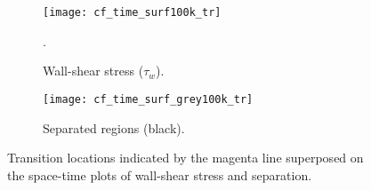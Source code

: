 \begin{figure}[h]
	\centering
	\begin{subfigure}[t]{0.46\textwidth}
		\centering
		\texttt{[image: cf\_time\_surf100k\_tr]}
		\caption{Wall-shear stress ($\tau_{w}$).}. 
		\label{fig:cf-time_tr}
	\end{subfigure}
	\begin{subfigure}[t]{0.45\textwidth}
		\centering
		\texttt{[image: cf\_time\_surf\_grey100k\_tr]}
		\caption{Separated regions (black).} 
		\label{fig:separation-time_tr}
	\end{subfigure}
	\caption{Transition locations indicated by the magenta line superposed on the space-time plots of wall-shear stress and separation.}
	\label{fig:space-time_tr}
\end{figure}

